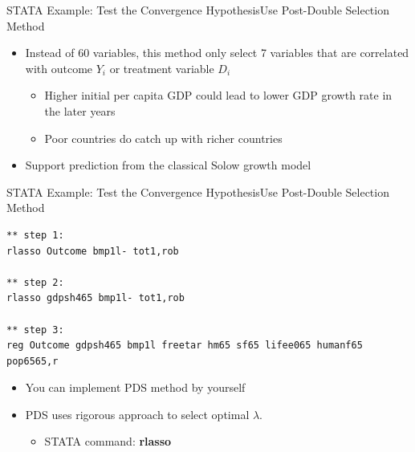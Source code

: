 \documentclass[dvipsnames,hyperref={pdfpagelabels=false}]{beamer}
\begin{document}
\begin{frame}[fragile]{STATA Example: Test the Convergence Hypothesis}{Use Post-Double Selection Method}
		
	
	\begin{itemize}	
		\vspace{0.2cm}
		\normalsize
		\item Instead of 60 variables, this method only select 7 variables that are correlated with outcome $Y_{i}$ or treatment variable $D_{i}$
		\vspace{0.2cm}
			\begin{itemize}	
				\item Higher initial per capita GDP could lead to lower GDP growth rate in the later years
		\vspace{0.2cm}
		\item Poor countries do catch up with richer countries
				\vspace{0.2cm}
					\end{itemize}
	    \item Support prediction from the classical Solow growth model

	\end{itemize}
	
	
\end{frame}



\begin{frame}[fragile]{STATA Example: Test the Convergence Hypothesis}{Use Post-Double Selection Method}
\begin{lstlisting}
** step 1: 
rlasso Outcome bmp1l- tot1,rob

** step 2: 
rlasso gdpsh465 bmp1l- tot1,rob

** step 3:
reg Outcome gdpsh465 bmp1l freetar hm65 sf65 lifee065 humanf65 pop6565,r

\end{lstlisting}
	
	\begin{itemize}	
	\item You can implement PDS method by yourself
		\vspace{0.2cm}
	\item PDS uses rigorous approach to select optimal $\lambda$.
	\vspace{0.2cm}
	\begin{itemize}
		\item STATA command: \textbf{rlasso}
	\end{itemize}


	\end{itemize}
	
	
\end{frame}
\end{document}

